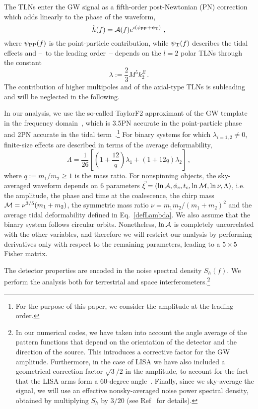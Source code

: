 \documentclass[aps,twocolumn,showpacs,preprintnumbers,nofootinbib,prd,superscriptaddress,groupedaddress,10pt]{revtex4-1}
\newcommand{\tn}{\textnormal}
\begin{document}
The TLNs enter the GW signal as a fifth-order post-Newtonian (PN) correction 
which adds linearly to the phase of the waveform,
\begin{equation}
\tilde{h}(f)={\cal A}(f)e^{i(\psi_\tn{PP}+\psi_\tn{T})}\ ,
\end{equation}
where $\psi_\tn{PP}(f)$ is the point-particle contribution, while $\psi_\tn{T}(f)$ describes the tidal 
effects and --~to the leading order~-- depends on the $l=2$ polar TLNs through the constant~\cite{Flanagan:2007ix,Hinderer:2007mb}
\begin{equation}
 \lambda:=\frac{2}{3}M^5 k_2^E\,. \label{deflambda}
\end{equation}
The contribution of higher multipoles and of the axial-type TLNs is subleading and will be neglected in the following.


In our analysis, we use the so-called TaylorF2 
approximant of the GW template in the frequency domain~\cite{PhysRevD.62.084036}, which is 3.5PN accurate in 
the point-particle phase and 2PN accurate in the tidal term~\cite{PhysRevD.83.084051,PhysRevD.85.124034}.\footnote{For the purpose of this paper, we consider the amplitude at the leading order.}
For binary systems for which $\lambda_{i=1,2}\neq 0$, finite-size effects are described in terms of the average deformability,
\begin{equation}
\Lambda=\frac{1}{26}\left[\left(1+\frac{12}{q}\right)\lambda_1+(1+12 q)\lambda_{2}\right]\,, \label{defLambda}
\end{equation}
where $q:=m_1/m_2\geqslant 1$ is the mass ratio. For nonspinning objects, the sky-averaged waveform depends on 6 
parameters $\vec{\xi}=(\ln{\cal A},\phi_c,t_c,\ln {\cal M},\ln\nu,\Lambda)$, i.e.  
the amplitude, the phase and time at the coalescence, the chirp mass ${\cal M}=\nu^{3/5}(m_1+m_2)$, 
the symmetric mass ratio $\nu={m_1m_2}/{(m_1+m_2)^2}$ and the average tidal deformability defined in Eq.~\eqref{defLambda}. We also assume that the binary system follows circular orbits.
%
Nonetheless, $\ln {\cal A}$ is completely uncorrelated with the other variables, and therefore we will 
restrict our analysis by performing derivatives only with respect to the remaining parameters, leading 
to a $5\times 5$ Fisher matrix. 

The detector properties are encoded in the noise spectral density $S_h(f)$. We perform the analysis both for terrestrial and space interferometers.\footnote{In our numerical codes, we have taken into account the angle average of the pattern functions that depend on the orientation of the detector and the direction of the source. This introduces a corrective factor for the GW amplitude. Furthermore, in the case of LISA we have also included a geometrical correction factor $\sqrt{3}/2$ in the amplitude, to account for the fact that the LISA arms form a 60-degree angle~\cite{Cutler:1997ta,Berti:2005ys}. Finally, since we sky-average the signal, we will use an effective nonsky-averaged noise power spectral density, obtained by multiplying
$S_h$ by $3/20$ (see Ref~\cite{Berti:2004bd} for details).} 
\end{document}
